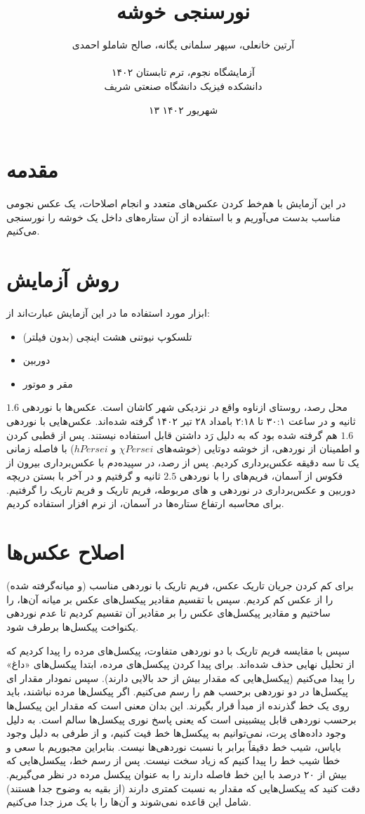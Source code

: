 \documentclass[12pt,a4paper]{article}
\title{نورسنجی خوشه}
\author{آرتین خانعلی، سپهر سلمانی یگانه، صالح شاملو احمدی\\\\
	آزمایشگاه نجوم، ترم تابستان ۱۴۰۲\\دانشکده فیزیک دانشگاه صنعتی شریف}
\date{۱۳ شهریور ۱۴۰۲}
\begin{document}
	\maketitle
	\section{مقدمه}
	در این آزمایش با هم‌خط کردن عکس‌های متعدد و انجام اصلاحات، یک عکس نجومی مناسب بدست می‌آوریم و
	با استفاده از آن ستاره‌های داخل یک خوشه را نورسنجی می‌کنیم.
	\section{روش آزمایش}
	ابزار مورد استفاده ما در این آزمایش عبارت‌اند از:
	\begin{itemize}
		\item تلسکوپ نیوتنی هشت اینچی (بدون فیلتر)
		\item دوربین 
		\item مقر و موتور
	\end{itemize}
	محل رصد، روستای ازناوه واقع در نزدیکی شهر کاشان است. عکس‌ها با نوردهی $1.6$ ثانیه و 
	در ساعت ۳۰:۱ تا ۲:۱۸ بامداد ۲۸ تیر ۱۴۰۲ گرفته شده‌اند. عکس‌هایی با نوردهی $1.6$ هم گرفته شده بود
	که به دلیل رَد داشتن قابل استفاده نیستند. پس از قطبی کردن و اطمینان از نوردهی، از خوشه دوتایی
	(خوشه‌های $\chi Persei$ و $h Persei$) با فاصله زمانی یک تا سه دقیقه عکس‌برداری کردیم. پس از رصد،
	در سپیده‌دم با عکس‌برداری بیرون از فکوس از آسمان، فریم‌های  را با نوردهی $2.5$ ثانیه و 
	گرفتیم و در آخر با بستن دریچه دوربین و عکس‌برداری در نوردهی و های مربوطه، فریم تاریک و
	فریم تاریک  را گرفتیم. برای محاسبه ارتفاع ستاره‌ها در آسمان، از نرم افزار  استفاده کردیم.
	\section{اصلاح عکس‌ها}
	برای کم کردن جریان تاریک عکس، فریم تاریک با نوردهی مناسب (و میانه‌گرفته شده) را از عکس کم کردیم.
	سپس با تقسیم مقادیر پیکسل‌های عکس  بر میانه آن‌ها،  را ساختیم و مقادیر پیکسل‌های
	عکس را بر مقادیر آن تقسیم کردیم تا عدم نوردهی یکنواخت پیکسل‌ها برطرف شود.
	
	سپس با مقایسه فریم تاریک با دو نوردهی متفاوت، پیکسل‌های مرده را پیدا کردیم که از تحلیل نهایی حذف شده‌اند.
	برای پیدا کردن پیکسل‌های مرده، ابتدا پیکسل‌های «داغ» را پیدا می‌کنیم (پیکسل‌هایی که مقدار بیش از حد بالایی دارند).
	سپس نمودار مقدار ای پیکسل‌ها در دو نوردهی برحسب هم را رسم می‌کنیم. اگر پیکسل‌ها مرده نباشند، باید روی یک خط
	گذرنده از مبدأ قرار بگیرند. این بدان معنی است که مقدار این پیکسل‌ها برحسب نوردهی قابل پیشبینی است که یعنی
	پاسخ نوری پیکسل‌ها سالم است. به دلیل وجود داده‌های پرت، نمی‌توانیم به پیکسل‌ها خط فیت کنیم، و از طرفی به دلیل
	وجود بایاس، شیب خط دقیقاً برابر با نسبت نوردهی‌ها نیست. بنابراین مجبوریم با سعی و خطا شیب خط را پیدا کنیم که
	زیاد سخت نیست. پس از رسم خط، پیکسل‌هایی که بیش از ۲۰ درصد با این خط فاصله دارند را به عنوان پیکسل مرده در نظر
	می‌گیریم. دقت کنید که پیکسل‌هایی که مقدار به نسبت کمتری دارند (از بقیه به وضوح جدا هستند) شامل این قاعده نمی‌شوند
	و آن‌ها را با یک مرز جدا می‌کنیم.
	
\end{document}
